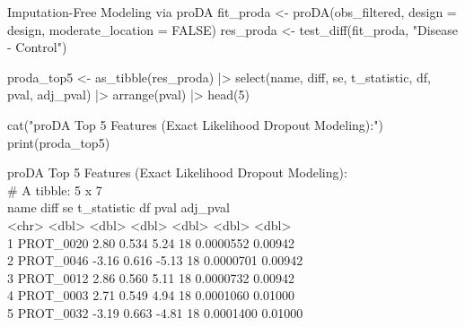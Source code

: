 \documentclass[11pt,oneside]{book}
\begin{document}
\begin{rchunk}{Imputation-Free Modeling via proDA}
fit_proda <- proDA(obs_filtered, design = design, moderate_location = FALSE)
res_proda <- test_diff(fit_proda, "Disease - Control")

proda_top5 <- as_tibble(res_proda) |>
  select(name, diff, se, t_statistic, df, pval, adj_pval) |>
  arrange(pval) |>
  head(5)

cat("proDA Top 5 Features (Exact Likelihood Dropout Modeling):\n")
print(proda_top5)
\end{rchunk}

\begin{routput}
proDA Top 5 Features (Exact Likelihood Dropout Modeling):\\
\# A tibble: 5 x 7\\
\hspace*{1em}name \hspace*{2em}diff \hspace*{1.8em}se t\_statistic \hspace*{1.5em}df \hspace*{2em}pval \hspace*{1.5em}adj\_pval\\
\hspace*{1em}\textless{}chr\textgreater{} \hspace*{1.5em}\textless{}dbl\textgreater{} \hspace*{1em}\textless{}dbl\textgreater{} \hspace*{2em}\textless{}dbl\textgreater{} \hspace*{1.5em}\textless{}dbl\textgreater{} \hspace*{1.8em}\textless{}dbl\textgreater{} \hspace*{1.8em}\textless{}dbl\textgreater{}\\
1 PROT\_0020 \hspace*{1.2em}2.80 0.534 \hspace*{2.2em}5.24 \hspace*{2em}18 0.0000552 0.00942\\
2 PROT\_0046 -3.16 0.616 \hspace*{1.6em}-5.13 \hspace*{2em}18 0.0000701 0.00942\\
3 PROT\_0012 \hspace*{1.2em}2.86 0.560 \hspace*{2.2em}5.11 \hspace*{2em}18 0.0000732 0.00942\\
4 PROT\_0003 \hspace*{1.2em}2.71 0.549 \hspace*{2.2em}4.94 \hspace*{2em}18 0.0001060 0.01000\\
5 PROT\_0032 -3.19 0.663 \hspace*{1.6em}-4.81 \hspace*{2em}18 0.0001400 0.01000
\end{routput}
\end{document}
